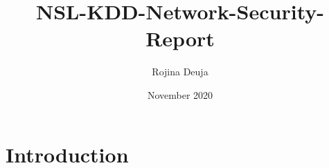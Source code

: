 \documentclass{article}
\title{NSL-KDD-Network-Security-Report}
\author{Rojina Deuja}
\date{November 2020}
\begin{document}
\maketitle

\section{Introduction}
\end{document}
